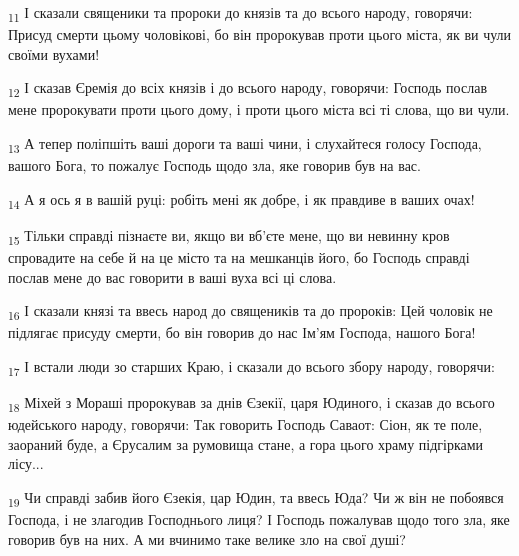 \begin{tcolorbox}
\textsubscript{11} І сказали священики та пророки до князів та до всього народу, говорячи: Присуд смерти цьому чоловікові, бо він пророкував проти цього міста, як ви чули своїми вухами!
\end{tcolorbox}
\begin{tcolorbox}
\textsubscript{12} І сказав Єремія до всіх князів і до всього народу, говорячи: Господь послав мене пророкувати проти цього дому, і проти цього міста всі ті слова, що ви чули.
\end{tcolorbox}
\begin{tcolorbox}
\textsubscript{13} А тепер поліпшіть ваші дороги та ваші чини, і слухайтеся голосу Господа, вашого Бога, то пожалує Господь щодо зла, яке говорив був на вас.
\end{tcolorbox}
\begin{tcolorbox}
\textsubscript{14} А я ось я в вашій руці: робіть мені як добре, і як правдиве в ваших очах!
\end{tcolorbox}
\begin{tcolorbox}
\textsubscript{15} Тільки справді пізнаєте ви, якщо ви вб'єте мене, що ви невинну кров спровадите на себе й на це місто та на мешканців його, бо Господь справді послав мене до вас говорити в ваші вуха всі ці слова.
\end{tcolorbox}
\begin{tcolorbox}
\textsubscript{16} І сказали князі та ввесь народ до священиків та до пророків: Цей чоловік не підлягає присуду смерти, бо він говорив до нас Ім'ям Господа, нашого Бога!
\end{tcolorbox}
\begin{tcolorbox}
\textsubscript{17} І встали люди зо старших Краю, і сказали до всього збору народу, говорячи:
\end{tcolorbox}
\begin{tcolorbox}
\textsubscript{18} Міхей з Мораші пророкував за днів Єзекії, царя Юдиного, і сказав до всього юдейського народу, говорячи: Так говорить Господь Саваот: Сіон, як те поле, заораний буде, а Єрусалим за румовища стане, а гора цього храму підгірками лісу...
\end{tcolorbox}
\begin{tcolorbox}
\textsubscript{19} Чи справді забив його Єзекія, цар Юдин, та ввесь Юда? Чи ж він не побоявся Господа, і не злагодив Господнього лиця? І Господь пожалував щодо того зла, яке говорив був на них. А ми вчинимо таке велике зло на свої душі?
\end{tcolorbox}
